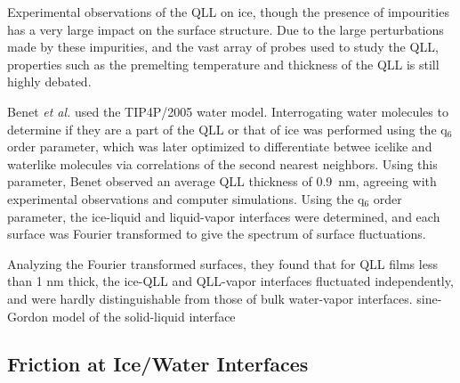 Experimental observations of the QLL on ice\cite{8-14}, though the
presence of impourities has a very large impact on the surface
structure.\cite{12,15} Due to the large perturbations made by these
impurities, and the vast array of probes used to study the QLL,
properties such as the premelting temperature and thickness of the QLL
is still highly debated.\cite{8} 

Benet \textit{et al.} used the TIP4P/2005 water model. Interrogating
water molecules to determine if they are a part of the QLL or that of
ice was performed using the q$_{6}$ order parameter\cite{42}, which
was later optimized to differentiate betwee icelike and waterlike
molecules via correlations of the second nearest neighbors.\cite{43}
Using this parameter, Benet observed an average QLL thickness of
0.9~nm, agreeing with experimental observations\cite{12,14} and
computer simulations.\cite{38-40} Using the q$_{6}$ order parameter,
the ice-liquid and liquid-vapor interfaces were determined, and each
surface was Fourier transformed to give the spectrum of surface
fluctuations.

Analyzing the Fourier transformed surfaces, they found that for QLL
films less than 1 nm thick, the ice-QLL and QLL-vapor interfaces
fluctuated independently, and were hardly distinguishable from those
of bulk water-vapor interfaces. sine-Gordon model of the solid-liquid
interface\cite{20,45}





\subsection{Friction at Ice/Water Interfaces}
%

